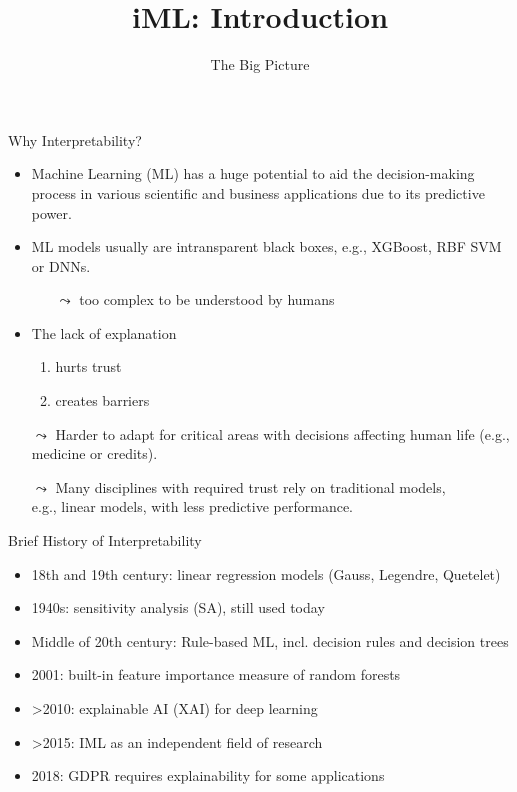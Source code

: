 \documentclass[aspectratio=169]{../latex_main/tntbeamer}  %
\title[Introduction]{iML: Introduction}
\subtitle{The Big Picture}
\begin{document}
	
	\maketitle


	\begin{frame}[c]{Why Interpretability?}
		
		\begin{itemize}
			\item Machine Learning (ML) has a huge potential to aid the decision-making process in various scientific and business applications due to its predictive power.
			\pause
			\smallskip
			\item ML models usually are intransparent black boxes, e.g., XGBoost, RBF SVM or DNNs.
			\begin{itemize}
				\item[$\leadsto$] too complex to be understood by humans
			\end{itemize}
			\pause
			\smallskip
			\item The lack of explanation
			\begin{enumerate}
				\item hurts trust
				\item creates barriers
			\end{enumerate}  
			\pause
			\smallskip
		    \item[$\leadsto$] Harder to adapt for critical areas with decisions affecting human life (e.g., medicine or credits).
			\pause
			\item[$\leadsto$] Many disciplines with required trust rely on traditional models,\\ e.g., linear models, with less predictive performance.
		\end{itemize}
		
	\end{frame}
	
	
	\begin{frame}[c]{Brief History of Interpretability}
		\begin{itemize}
			\item 18th and 19th century: linear regression models (Gauss, Legendre, Quetelet)
			\item 1940s: sensitivity analysis (SA), still used today
			\item Middle of 20th century: Rule-based ML, incl. decision rules and decision trees
			\item 2001: built-in feature importance measure of random forests
			\item >2010: explainable AI (XAI) for deep learning
			\item >2015: IML as an independent field of research 
			\item 2018: GDPR requires explainability for some applications 
		\end{itemize}
	\end{frame}
	
\end{document}
